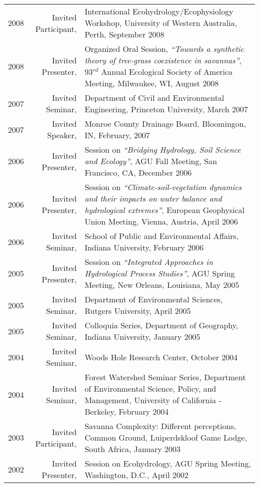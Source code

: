\documentclass[10pt]{report}
\begin{document}
\begin{longtable}{p{.25in} r p{}}
2008 & Invited Participant, &  International Ecohydrology/Ecophysiology Workshop, University of Western Australia, Perth, September 2008 \\
2008 & Invited Presenter, & Organized Oral Session, \emph{``Towards a synthetic theory of tree-grass coexistence in savannas''}, 93$^{rd}$ Annual Ecological Society of America Meeting, Milwaukee, WI, August 2008 \\
2007 & Invited Seminar, & Department of Civil and Environmental Engineering, Princeton University, March 2007 \\
2007 & Invited Speaker, & Monroe County Drainage Board, Bloomingon, IN, February, 2007 \\
2006 & Invited Presenter, & Session on \emph{``Bridging Hydrology, Soil Science and Ecology''}, AGU Fall Meeting, San Francisco, CA, December 2006 \\
2006 & Invited Presenter, & Session on \emph{``Climate-soil-vegetation dynamics and their impacts on water balance and hydrological extremes''}, European Geophysical Union Meeting, Vienna, Austria, April 2006 \\
2006 & Invited Seminar, & School of Public and Environmental Affairs, Indiana University, February 2006 \\ 
2005 & Invited Presenter, & Session on \emph{``Integrated Approaches in Hydrological Process Studies''}, AGU Spring Meeting, New Orleans, Louisiana, May 2005 \\
2005 & Invited Seminar, & Department of Environmental Sciences, Rutgers University, April 2005 \\
2005 & Invited Seminar, & Colloquia Series, Department of Geography, Indiana University, January 2005 \\
2004 & Invited Seminar, & Woods Hole Research Center, October 2004 \\
2004 & Invited Seminar, & Forest Watershed Seminar Series, Department of Environmental Science, Policy, and Management, University of California - Berkeley, February 2004 \\
2003 & Invited Participant, & Savanna Complexity: Different perceptions, Common Ground, Luiperdskloof Game Lodge, South Africa, January 2003 \\
2002 & Invited Presenter, & Session on Ecohydrology, AGU Spring Meeting, Washington, D.C., April 2002 \\
\end{longtable}

\vspace{0.1in}
\end{document}
